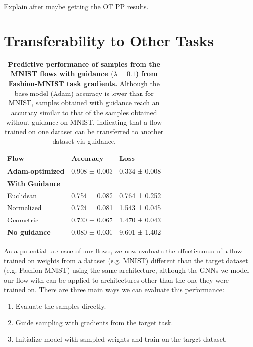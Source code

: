 {\color{red} Explain after maybe getting the OT PP results.}

\section{Transferability to Other Tasks} \label{sec:task_generalization}

\begin{table}[t!]
    \centering
    \begin{tabular}{lll}
        \toprule
        \textbf{Flow} & \textbf{Accuracy} & \textbf{Loss} \\
        \midrule
        \textbf{Adam-optimized} & 0.908 ± 0.003 & 0.334 ± 0.008 \\
        \midrule
        \textbf{With Guidance} & & \\
        Euclidean   & 0.754 ± 0.082     & 0.764 ± 0.252 \\
        Normalized  & 0.724 ± 0.081     & 1.543 ± 0.045 \\
        Geometric   & 0.730 ± 0.067     & 1.470 ± 0.043 \\
        \midrule
        \textbf{No guidance} & 0.080 ± 0.030 & 9.601 ± 1.402 \\ 
        \bottomrule
    \end{tabular}
    \caption{\label{tab:mnist_generalization}\textbf{Predictive performance of samples from the MNIST flows with guidance ($\lambda = 0.1$) from Fashion-MNIST task gradients.} Although the base model (Adam) accuracy is lower than for MNIST, samples obtained with guidance reach an accuracy similar to that of the samples obtained without guidance on MNIST, indicating that a flow trained on one dataset can be transferred to another dataset via guidance. }
\end{table}


As a potential use case of our flows, we now evaluate the effectiveness of a flow trained on weights from a dataset (e.g. MNIST) different than the target dataset (e.g. Fashion-MNIST) using the same architecture, although the GNNs we model our flow with can be applied to architectures other than the one they were trained on. There are three main ways we can evaluate this performance:
\begin{enumerate}
    \item Evaluate the samples directly.
    \item Guide sampling with gradients from the target task. 
    \item Initialize model with sampled weights and train on the target dataset.
\end{enumerate}

